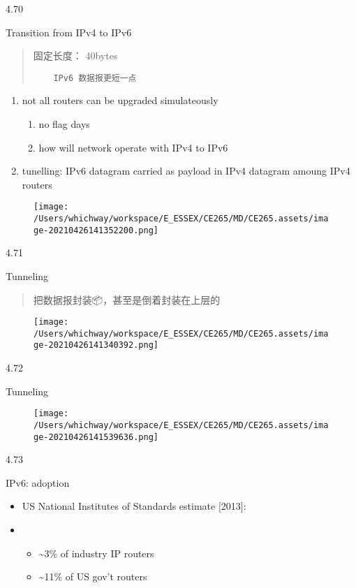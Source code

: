 \documentclass[
]{article}
\begin{document}
4.70

Transition from IPv4 to IPv6

\begin{quote}
固定长度： 40bytes

\begin{verbatim}
	IPv6 数据报更短一点
\end{verbatim}
\end{quote}

\begin{enumerate}
\def\labelenumi{\arabic{enumi}.}
\item
  not all routers can be upgraded simulateously

  \begin{enumerate}
  \def\labelenumii{\arabic{enumii}.}
  \item
    no flag days
  \item
    how will network operate with IPv4 to IPv6
  \end{enumerate}
\item
  tunelling: IPv6 datagram carried as payload in IPv4 datagram amoung
  IPv4 routers
\end{enumerate}

\begin{figure}
\centering
\texttt{[image: /Users/whichway/workspace/E\_ESSEX/CE265/MD/CE265.assets/image-20210426141352200.png]}
\caption{}
\end{figure}

4.71

Tunneling

\begin{quote}
把数据报封装📦，甚至是倒着封装在上层的
\end{quote}

\begin{figure}
\centering
\texttt{[image: /Users/whichway/workspace/E\_ESSEX/CE265/MD/CE265.assets/image-20210426141340392.png]}
\caption{}
\end{figure}

4.72

Tunneling

\begin{figure}
\centering
\texttt{[image: /Users/whichway/workspace/E\_ESSEX/CE265/MD/CE265.assets/image-20210426141539636.png]}
\caption{}
\end{figure}

4.73

IPv6: adoption

\begin{itemize}
\item
  US National Institutes of Standards estimate {[}2013{]}:
\item
  \begin{itemize}
  \item
    \textasciitilde3\% of industry IP routers
  \item
    \textasciitilde11\% of US gov't routers
  \end{itemize}
\end{itemize}
\end{document}
